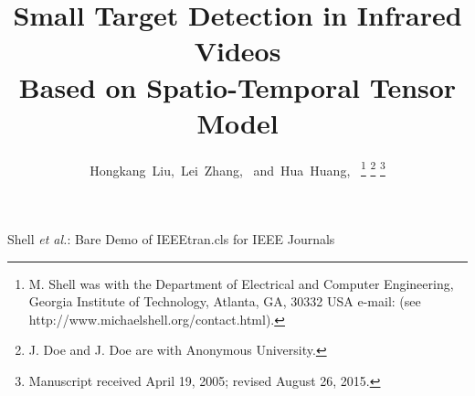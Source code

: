 \documentclass[journal]{IEEEtran}
\begin{document}
\title{Small Target Detection in Infrared Videos \\Based on Spatio-Temporal Tensor Model}
%
%
%

\author{Hongkang~Liu,~Lei~Zhang,~
        and~Hua~Huang,~%
\thanks{M. Shell was with the Department
of Electrical and Computer Engineering, Georgia Institute of Technology, Atlanta,
GA, 30332 USA e-mail: (see http://www.michaelshell.org/contact.html).}%
\thanks{J. Doe and J. Doe are with Anonymous University.}%
\thanks{Manuscript received April 19, 2005; revised August 26, 2015.}}

% 
%



%
{Shell \MakeLowercase{\textit{et al.}}: Bare Demo of IEEEtran.cls for IEEE Journals}
% 
\end{document}
